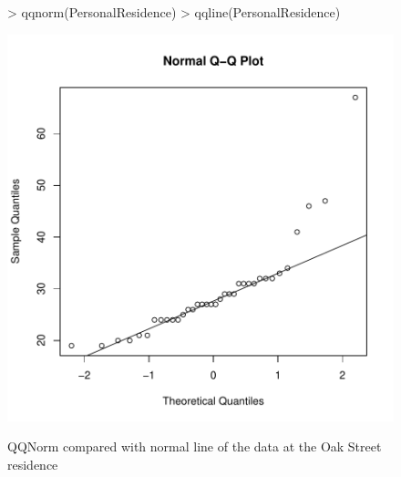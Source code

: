 \documentclass{article}
\begin{document}
\begin{figure}
\centering
\caption{QQNorm compared with normal line of the data at the Oak Street residence}
\begin{Schunk}
\begin{Sinput}
> qqnorm(PersonalResidence)
> qqline(PersonalResidence)
\end{Sinput}
\end{Schunk}
\includegraphics{FinalProjectPingTimes-004}
\label{residenceNorm}
\end{figure}
\end{document}
